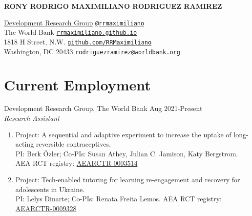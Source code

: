\documentclass[a4paper, 10pt]{article}
\makeatletter
\renewenvironment{itemize}{
  \begin{list}{}
    { \setlength{\itemsep}{5pt}
      \setlength{\parsep}{0pt}
      \setlength{\topsep}{0pt}
      \setlength{\leftmargin}{0em} } }{
  \end{list}}
\def\myemail{rodriguezramirez@worldbank.org}
\def\myweb{rrmaximiliano.github.io}
\def\mytwitter{@rrmaximiliano}
\def\mygithub{github.com/RRMaximiliano}
\makeatother
\begin{document}
\thispagestyle{empty}

{\Large\bf RONY RODRIGO MAXIMILIANO RODRIGUEZ RAMIREZ}

\medskip

\href{https://www.worldbank.org/en/about/unit/unit-dec}{Development Research Group} \hfill \texttt{\href{https://twitter.com/RRMaximiliano}{\mytwitter}} \, \faTwitter \\ 
The World Bank   \hfill   \texttt{\href{https://rrmaximiliano.github.io}{\myweb}} \, \faLink \\   
1818 H Street, N.W. \hfill \texttt{\href{https://github.com/RRMaximiliano}{\mygithub}} \, \faGithub  \\
Washington, DC 20433 \hfill \texttt{\href{mailto:\myemail}{\myemail}} \, \faEdit
\medskip


\section*{Current Employment}
\begin{itemize}
\item Development Research Group, The World Bank \hfill Aug 2021-Present \\
{\small \textit{Research Assistant} }
  \begin{enumerate}[leftmargin=10pt, label={}, nosep]
    \item {\small Project: A sequential and adaptive experiment to increase the uptake of long-acting reversible contraceptives.} \\ {\small PI: Berk Özler; Co-PIs: Susan Athey, Julian C. Jamison, Katy Bergstrom.} {\small AEA RCT registry: \href{https://www.socialscienceregistry.org/trials/3514}{AEARCTR-0003514}}
    \item {\small Project: Tech-enabled tutoring for learning re-engagement and recovery for adolescents in Ukraine.} \\ {\small PI: Lelys Dinarte; Co-PIs: Renata Freita Lemos.} {\small AEA RCT registry: \href{https://www.socialscienceregistry.org/trials/9328}{AEARCTR-0009328}}
  \end{enumerate}  
\end{itemize}

\end{document}
